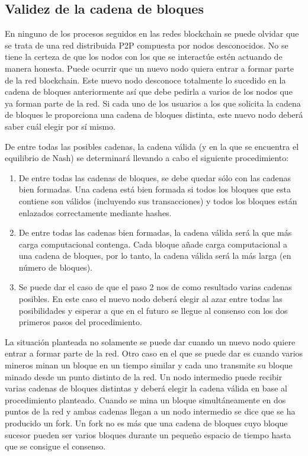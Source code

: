 \subsection{Validez de la cadena de bloques}
En ninguno de los procesos seguidos en las redes blockchain se puede olvidar que se trata de una red distribuida P2P compuesta por nodos desconocidos. No se tiene la certeza de que los nodos con los que se interactúe estén actuando de manera honesta. Puede ocurrir que un nuevo nodo quiera entrar a formar parte de la red blockchain. Este nuevo nodo desconoce totalmente lo sucedido en la cadena de bloques anteriormente así que debe pedirla a varios de los nodos que ya forman parte de la red. Si cada uno de los usuarios a los que solicita la cadena de bloques le proporciona una cadena de bloques distinta, este nuevo nodo deberá saber cuál elegir por sí mismo. \newline

De entre todas las posibles cadenas, la cadena válida (y en la que se encuentra el equilibrio de Nash) se determinará llevando a cabo el siguiente procedimiento:

\begin{enumerate}
	\item De entre todas las cadenas de bloques, se debe quedar sólo con las cadenas bien formadas. Una cadena está bien formada si todos los bloques que esta contiene son válidos (incluyendo sus transacciones) y todos los bloques están enlazados correctamente mediante hashes.
	\item De entre todas las cadenas bien formadas, la cadena válida será la que más carga computacional contenga. Cada bloque añade carga computacional a una cadena de bloques, por lo tanto, la cadena válida será la más larga (en número de bloques).
	\item Se puede dar el caso de que el paso 2 nos de como resultado varias cadenas posibles. En este caso el nuevo nodo deberá elegir al azar entre todas las posibilidades y esperar a que en el futuro se llegue al consenso con los dos primeros pasos del procedimiento.
\end{enumerate}

La situación planteada no solamente se puede dar cuando un nuevo nodo quiere entrar a formar parte de la red. Otro caso en el que se puede dar es cuando varios mineros minan un bloque en un tiempo similar y cada uno transmite su bloque minado desde un punto distinto de la red. Un nodo intermedio puede recibir varias cadenas de bloques distintas y deberá elegir la cadena válida en base al procedimiento planteado. Cuando se mina un bloque simultáneamente en dos puntos de la red y ambas cadenas llegan a un nodo intermedio se dice que se ha producido un fork. Un fork no es más que una cadena de bloques cuyo bloque sucesor pueden ser varios bloques durante un pequeño espacio de tiempo hasta que se consigue el consenso.

